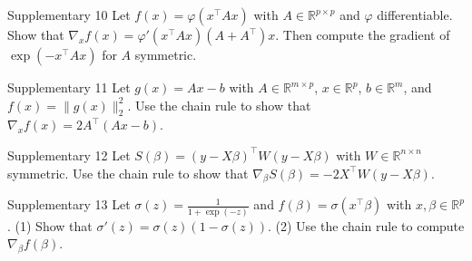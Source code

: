 \begin{Exercise}{Supplementary 10}{}
  Let $f(x) = \varphi(x^\top Ax)$ with $A \in \mathbb{R}^{p\times p}$ and $\varphi$ differentiable. Show that
  $\nabla_xf(x) = \varphi'(x^\top Ax)(A + A^\top)x$. Then compute the gradient of $\exp(-x^\top Ax)$ for $A$ symmetric.
\end{Exercise}


\begin{Exercise}{Supplementary 11}{}
  Let $g(x) = Ax - b$ with $A \in \mathbb{R}^{m\times p}$, $x \in \mathbb{R}^p$, $b \in \mathbb{R}^m$, and $f(x) = \|g(x)\|_2^2$.
  Use the chain rule to show that $\nabla_xf(x) = 2A^\top(Ax - b)$.
\end{Exercise}


\begin{Exercise}{Supplementary 12}{}
  Let $S(\beta) = (y - X\beta)^\top W(y - X\beta)$ with $W \in \mathbb{R}^{n \times n}$ symmetric. Use the chain rule to show that
  $\nabla_\beta S(\beta) = -2X^\top W(y - X\beta)$.
\end{Exercise}


\begin{Exercise}{Supplementary 13}{}
  Let $\sigma(z) = \frac{1}{1 + \exp(-z)}$ and $f(\beta) = \sigma(x^\top\beta)$ with $x, \beta \in \mathbb{R}^p$.
  (1) Show that $\sigma'(z) = \sigma(z)(1 - \sigma(z))$. (2) Use the chain rule to compute $\nabla_\beta f(\beta)$.
\end{Exercise}

